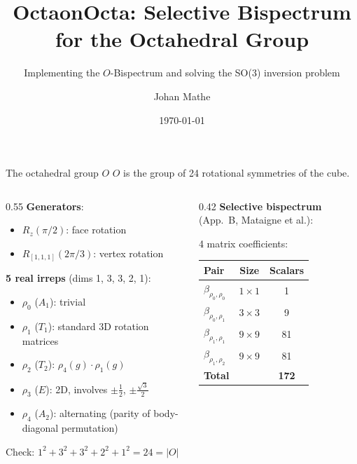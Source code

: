 \documentclass[aspectratio=169]{beamer}
\title{OctaonOcta: Selective Bispectrum for the Octahedral Group}
\subtitle{Implementing the $O$-Bispectrum and solving the SO(3) inversion problem}
\author{Johan Mathe}
\date{\today}
\begin{document}
\maketitle

\begin{frame}{The octahedral group $O$}
  $O$ is the group of 24 rotational symmetries of the cube.

  \medskip

  \begin{columns}[T]
    \begin{column}{0.55\textwidth}
      \textbf{Generators}:
      \begin{itemize}
        \item $R_z(\pi/2)$: face rotation
        \item $R_{[1,1,1]}(2\pi/3)$: vertex rotation
      \end{itemize}

      \bigskip

      \textbf{5 real irreps} (dims 1, 3, 3, 2, 1):
      \begin{itemize}
        \item $\rho_0$ ($A_1$): trivial
        \item $\rho_1$ ($T_1$): standard 3D rotation matrices
        \item $\rho_2$ ($T_2$): $\rho_4(g) \cdot \rho_1(g)$
        \item $\rho_3$ ($E$): 2D, involves $\pm\tfrac{1}{2}$, $\pm\tfrac{\sqrt{3}}{2}$
        \item $\rho_4$ ($A_2$): alternating (parity of body-diagonal permutation)
      \end{itemize}

      \bigskip

      Check: $1^2 + 3^2 + 3^2 + 2^2 + 1^2 = 24 = |O|$ \quad\checkmark
    \end{column}
    \begin{column}{0.42\textwidth}
      \textbf{Selective bispectrum} (App.~B, Mataigne et al.):

      \medskip

      4 matrix coefficients:

      \smallskip

      \begin{tabular}{lcc}
        \toprule
        Pair & Size & Scalars \\
        \midrule
        $\beta_{\rho_0,\rho_0}$ & $1\times 1$ & 1 \\
        $\beta_{\rho_0,\rho_1}$ & $3\times 3$ & 9 \\
        $\beta_{\rho_1,\rho_1}$ & $9\times 9$ & 81 \\
        $\beta_{\rho_1,\rho_2}$ & $9\times 9$ & 81 \\
        \midrule
        \textbf{Total} & & \textbf{172} \\
        \bottomrule
      \end{tabular}


\end{column}
\end{columns}
\end{frame}
\end{document}
